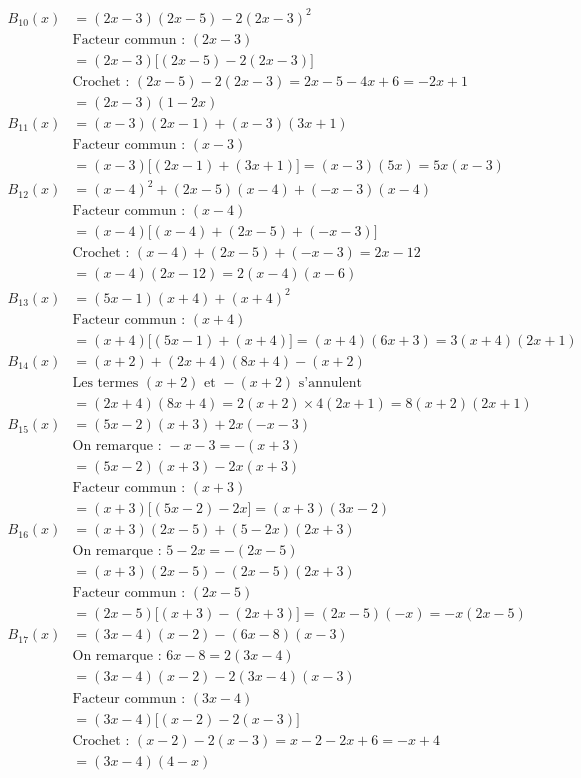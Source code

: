 \documentclass[11pt]{article}
\begin{document}
\[\begin{aligned}
		B_{10}(x) &= (2x-3)(2x-5)-2(2x-3)^2\\
		&\text{Facteur commun : } (2x-3)\\
		&= (2x-3)\big[(2x-5)-2(2x-3)\big]\\
		&\text{Crochet : } (2x-5)-2(2x-3) = 2x-5-4x+6 = -2x+1\\
		&= (2x-3)(1-2x)\\[4pt]
		B_{11}(x) &= (x-3)(2x-1)+(x-3)(3x+1)\\
		&\text{Facteur commun : } (x-3)\\
		&= (x-3)\big[(2x-1)+(3x+1)\big] = (x-3)(5x) = 5x(x-3)\\[4pt]
		B_{12}(x) &= (x-4)^2+(2x-5)(x-4)+(-x-3)(x-4)\\
		&\text{Facteur commun : } (x-4)\\
		&= (x-4)\big[(x-4)+(2x-5)+(-x-3)\big]\\
		&\text{Crochet : } (x-4)+(2x-5)+(-x-3) = 2x-12\\
		&= (x-4)(2x-12) = 2(x-4)(x-6)\\[4pt]
		B_{13}(x) &= (5x-1)(x+4)+(x+4)^2\\
		&\text{Facteur commun : } (x+4)\\
		&= (x+4)\big[(5x-1)+(x+4)\big] = (x+4)(6x+3) = 3(x+4)(2x+1)\\[4pt]
		B_{14}(x) &= (x+2)+(2x+4)(8x+4)-(x+2)\\
		&\text{Les termes } (x+2) \text{ et } -(x+2) \text{ s'annulent}\\
		&= (2x+4)(8x+4) = 2(x+2)\times 4(2x+1) = 8(x+2)(2x+1)\\[4pt]
		B_{15}(x) &= (5x-2)(x+3)+2x(-x-3)\\
		&\text{On remarque : } -x-3 = -(x+3)\\
		&= (5x-2)(x+3) - 2x(x+3)\\
		&\text{Facteur commun : } (x+3)\\
		&= (x+3)\big[(5x-2)-2x\big] = (x+3)(3x-2)\\[4pt]
		B_{16}(x) &= (x+3)(2x-5)+(5-2x)(2x+3)\\
		&\text{On remarque : } 5-2x = -(2x-5)\\
		&= (x+3)(2x-5) - (2x-5)(2x+3)\\
		&\text{Facteur commun : } (2x-5)\\
		&= (2x-5)\big[(x+3)-(2x+3)\big] = (2x-5)(-x) = -x(2x-5)\\[4pt]
		B_{17}(x) &= (3x-4)(x-2)-(6x-8)(x-3)\\
		&\text{On remarque : } 6x-8 = 2(3x-4)\\
		&= (3x-4)(x-2) - 2(3x-4)(x-3)\\
		&\text{Facteur commun : } (3x-4)\\
		&= (3x-4)\big[(x-2)-2(x-3)\big]\\
		&\text{Crochet : } (x-2)-2(x-3) = x-2-2x+6 = -x+4\\
		&= (3x-4)(4-x)
	\end{aligned}
	\]
	
\end{document}
